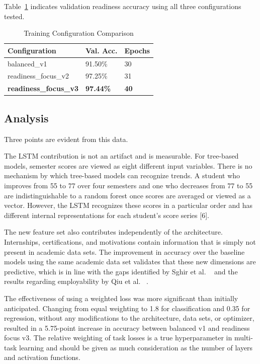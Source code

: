 \documentclass[conference]{IEEEtran}
\begin{document}
Table~\ref{tab:configs} indicates validation readiness accuracy using all three configurations tested.

\begin{table}
\caption{Training Configuration Comparison}
\label{tab:configs}
\centering
\renewcommand{\arraystretch}{1.3}
\begin{tabular}{|p{2.9cm}|p{2cm}|p{1.4cm}|}
\hline
\textbf{Configuration} & \textbf{Val. Acc.} & \textbf{Epochs} \\
\hline
balanced\_v1 & 91.50\% & 30 \\
\hline
readiness\_focus\_v2 & 97.25\% & 31 \\
\hline
\textbf{readiness\_focus\_v3} & \textbf{97.44\%} & \textbf{40} \\
\hline
\end{tabular}
\end{table}

\subsection{Analysis}

Three points are evident from this data.

The LSTM contribution is not an artifact and is measurable. For tree-based models, semester scores are viewed as eight different input variables. There is no mechanism by which tree-based models can recognize trends. A student who improves from 55 to 77 over four semesters and one who decreases from 77 to 55 are indistinguishable to a random forest once scores are averaged or viewed as a vector. However, the LSTM recognizes these scores in a particular order and has different internal representations for each student's score series [6].

The new feature set also contributes independently of
the architecture. Internships, certifications, and motivations
contain information that is simply not present in academic
data sets. The improvement in accuracy over the baseline
models using the same academic data set validates that these
new dimensions are predictive, which is in line with the gaps
identified by Sghir et al. ~\cite{R4} and the results regarding
employability by Qiu et al. ~\cite{R10}.

The effectiveness of using a weighted loss was more
significant than initially anticipated. Changing from equal
weighting to 1.8 for classification and 0.35 for regression,
without any modifications to the architecture, data sets,
or optimizer, resulted in a 5.75-point increase in accuracy
between balanced v1 and readiness focus v3.
The relative weighting of task losses is a true
hyperparameter in multi-task learning and should be given
as much consideration as the number of layers and activation
functions.
\end{document}
